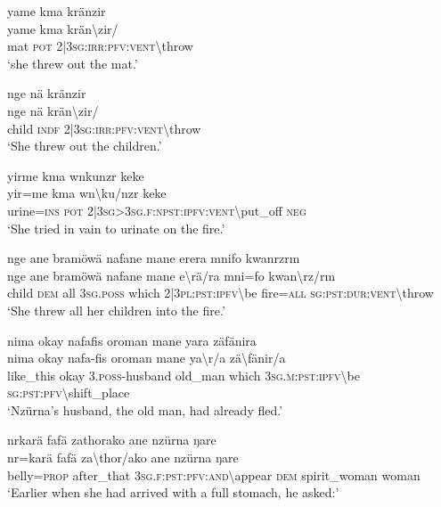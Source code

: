 \ea\label{ex:8:a1844}
yame kma kränzir\\
\gll yame	kma	krän{\textbackslash}zir/\\
     mat	\textsc{pot}	2|3\textsc{sg}:\textsc{irr}:\textsc{pfv}:\textsc{vent}{\textbackslash}throw\\
\glt `she threw out the mat.'
\z

\ea\label{ex:8:a1845}
nge nä kränzir\\
\gll nge	nä	krän{\textbackslash}zir/\\
     child	\textsc{indf}	2|3\textsc{sg}:\textsc{irr}:\textsc{pfv}:\textsc{vent}{\textbackslash}throw\\
\glt `She threw out the children.'
\z

\ea\label{ex:8:a1846}
yirme kma wnkunzr keke\\
\gll yir=me	kma	wn{\textbackslash}ku/nzr	keke\\
     urine=\textsc{ins}	\textsc{pot}	2|3\textsc{sg}>3\textsc{sg}.\textsc{f}:\textsc{npst}:\textsc{ipfv}:\textsc{vent}{\textbackslash}put\_off	\textsc{neg}\\
\glt `She tried in vain to urinate on the fire.'
\z

\ea\label{ex:8:a1847}
nge ane bramöwä nafane mane erera mnifo kwanrzrm\\
\gll nge	ane	bramöwä	nafane	mane	e{\textbackslash}rä/ra	mni=fo	kwan{\textbackslash}rz/rm\\
     child	\textsc{dem}	all	3\textsc{sg}.\textsc{poss}	which	2|3\textsc{pl}:\textsc{pst}:\textsc{ipfv}{\textbackslash}be	fire=\textsc{all}	\textsc{sg}:\textsc{pst}:\textsc{dur}:\textsc{vent}{\textbackslash}throw\\
\glt `She threw all her children into the fire.'
\z

\ea\label{ex:8:a1849}
nima okay nafafis oroman mane yara zäfänira\\
\gll nima	okay	nafa-fis	oroman	mane	ya{\textbackslash}r/a	zä{\textbackslash}fänir/a\\
     like\_this	okay	3.\textsc{poss}-husband	old\_man	which	3\textsc{sg}.\textsc{m}:\textsc{pst}:\textsc{ipfv}{\textbackslash}be	\textsc{sg}:\textsc{pst}:\textsc{pfv}{\textbackslash}shift\_place\\
\glt `Nzürna's husband, the old man, had already fled.'
\z

\ea\label{ex:8:a1851}
nrkarä fafä zathorako ane nzürna ŋare\\
\gll nr=karä	fafä	za{\textbackslash}thor/ako	ane	nzürna	ŋare\\
     belly=\textsc{prop}	after\_that	3\textsc{sg}.\textsc{f}:\textsc{pst}:\textsc{pfv}:\textsc{and}{\textbackslash}appear	\textsc{dem}	spirit\_woman	woman\\
\glt `Earlier when she had arrived with a full stomach, he asked:'
\z

